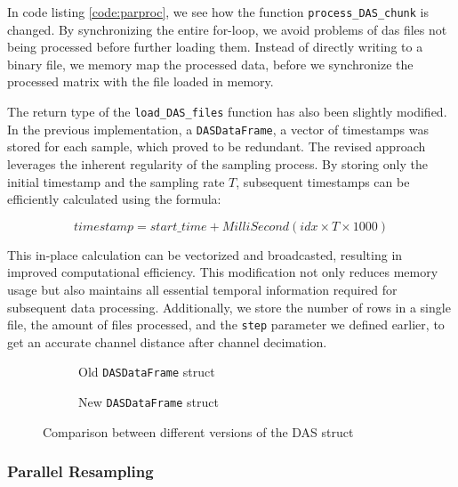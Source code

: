 

In code listing \ref{code:parproc}, we see how the function \texttt{process\_DAS\_chunk} is changed. By synchronizing the entire for-loop, we avoid problems of \acrshort{das} files not being processed before further loading them. Instead of directly writing to a binary file, we memory map the processed data, before we synchronize the processed matrix with the file loaded in memory.

The return type of the \texttt{load\_DAS\_files} function has also been slightly modified. In the previous implementation, a \texttt{DASDataFrame}, a vector of timestamps was stored for each sample, which proved to be redundant. The revised approach leverages the inherent regularity of the sampling process. By storing only the initial timestamp and the sampling rate $T$, subsequent timestamps can be efficiently calculated using the formula:

$$timestamp = start\_time + MilliSecond(idx \times T \times 1000)$$

This in-place calculation can be vectorized and broadcasted, resulting in improved computational efficiency. This modification not only reduces memory usage but also maintains all essential temporal information required for subsequent data processing. Additionally, we store the number of rows in a single file, the amount of files processed, and the \texttt{step} parameter we defined earlier, to get an accurate channel distance after channel decimation.\\

\begin{figure}[!h]
\centering
\begin{subfigure}{.45\textwidth}
  \centering
  
  \caption{Old \texttt{DASDataFrame} struct}
  \label{fig:olddasstc}
\end{subfigure}%
\hfill
\begin{subfigure}{.45\textwidth}
  \centering
  
  \caption{New \texttt{DASDataFrame} struct}
  \label{fig:newdasstc}
\end{subfigure}
\caption{Comparison between different versions of the DAS struct}
\label{fig:dasstccmp}
\end{figure}


\subsubsection{Parallel Resampling}

